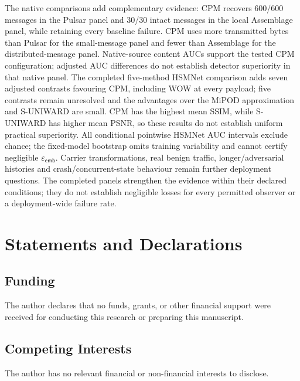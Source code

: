 \documentclass[pdflatex,sn-mathphys-num]{sn-jnl}%
\theoremstyle{definition}
\theoremstyle{game}
\theoremstyle{thmstyleone}%
\theoremstyle{thmstyletwo}%
\theoremstyle{thmstylethree}%
\begin{document}
The native comparisons add complementary evidence: CPM recovers
600/600 messages in the Pulsar panel and 30/30 intact messages in the
local Assemblage panel, while retaining every baseline failure. CPM
uses more transmitted bytes than Pulsar for the small-message panel
and fewer than Assemblage for the distributed-message panel. Native-source
content AUCs support the tested CPM configuration; adjusted AUC differences
do not establish detector superiority in that native panel. The completed
five-method HSMNet comparison adds seven adjusted contrasts favouring CPM,
including WOW at every payload; five contrasts remain unresolved and the
advantages over the MiPOD approximation and S-UNIWARD are small. CPM has
the highest mean SSIM, while S-UNIWARD has higher mean PSNR, so these
results do not establish uniform practical superiority. All conditional
pointwise HSMNet AUC intervals exclude chance; the fixed-model bootstrap
omits training variability and cannot certify negligible
$\varepsilon_{\mathsf{emb}}$. Carrier transformations, real benign traffic, longer/adversarial
histories and crash/concurrent-state behaviour remain further deployment
questions. The completed panels strengthen the evidence within their
declared conditions; they do not establish negligible losses for every
permitted observer or a deployment-wide failure rate.








\backmatter

\section*{Statements and Declarations}

\subsection*{Funding}

The author declares that no funds, grants, or other financial support were received for conducting this research or preparing this manuscript.

\subsection*{Competing Interests}

The author has no relevant financial or non-financial interests to disclose.

\end{document}
